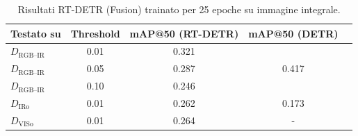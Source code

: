 \documentclass[a4paper,12pt]{article}
\begin{document}
\begin{table}[H]
\centering
\caption{Risultati RT-DETR (Fusion) trainato per 25 epoche su immagine integrale.}
\label{tab:rtdetr_base_25}
\begin{tabular}{lcccc}
\toprule
Testato su & Threshold & mAP@50 (RT-DETR) & mAP@50 (DETR) \\
\midrule
$D_{\text{RGB--IR}}$ & 0.01 & 0.321 & \multirow{3}{*}{0.417} \\
$D_{\text{RGB--IR}}$ & 0.05 & 0.287 & \\
$D_{\text{RGB--IR}}$ & 0.10 & 0.246 & \\
\midrule
$D_{\text{IRo}}$ & 0.01 & 0.262 & 0.173 \\
$D_{\text{VISo}}$ & 0.01 & 0.264 & - \\
\bottomrule
\end{tabular}
\end{table}
\end{document}
